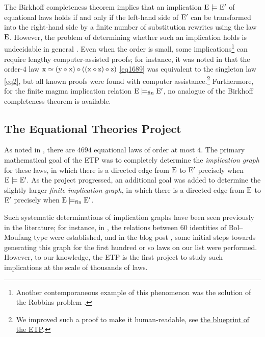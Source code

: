The Birkhoff completeness theorem \cite[Th.~3.5.14]{term-rewriting} implies that an implication ${\mathrm{E}} \models {\mathrm{E}'}$ of equational laws holds if and only if the left-hand side of ${\mathrm{E}'}$ can be transformed into the right-hand side by a finite number of substitution rewrites using the law $\mathrm{E}$. However, the problem of determining whether such an implication holds is undecidable in general \cite{mckenzie}. Even when the order is small, some implications\footnote{Another contemporaneous example of this phenomenon was the solution of the Robbins problem \cite{robbins}.} can require lengthy computer-assisted proofs; for instance, it was noted in \cite{Kisielewicz2} that the order-$4$ law $\mathrm{x} \simeq (\mathrm{y} \diamond \mathrm{x}) \diamond ((\mathrm{x} \diamond \mathrm{z}) \diamond \mathrm{z})$ \eqref{eq1689} was equivalent to the singleton law \eqref{eq2}, but all known proofs were found with computer assistance.\footnote{We improved such a proof to make it human-readable, see \href{https://teorth.github.io/equational_theories/blueprint/implications-chapter.html}{the blueprint of the ETP}.}  Furthermore, for the finite magma implication relation ${\mathrm{E}} \models_{\mathrm{fin}} {\mathrm{E}'}$, no analogue of the Birkhoff completeness theorem is available.

\subsection{The Equational Theories Project}

As noted in , there are $\num{4694}$ equational laws of order at most $4$. The primary mathematical goal of the ETP was to completely determine the \emph{implication graph} for these laws, in which there is a directed edge from $\mathrm{E}$ to ${\mathrm{E}'}$ precisely when ${\mathrm{E}} \models {\mathrm{E}'}$. As the project progressed, an additional goal was added to determine the slightly larger \emph{finite implication graph}, in which there is a directed edge from $\mathrm{E}$ to ${\mathrm{E}'}$ precisely when ${\mathrm{E}} \models_{\mathrm{fin}} {\mathrm{E}'}$.

Such systematic determinations of implication graphs have been seen previously in the literature; for instance, in \cite{phillips-vojtechovsky}, the relations between $60$ identities of Bol--Moufang type were established, and in the blog post \cite[\S 17]{Wolfram_2022}, some initial steps towards generating this graph for the first hundred or so laws on our list were performed. However, to our knowledge, the ETP is the first project to study such implications at the scale of thousands of laws.

